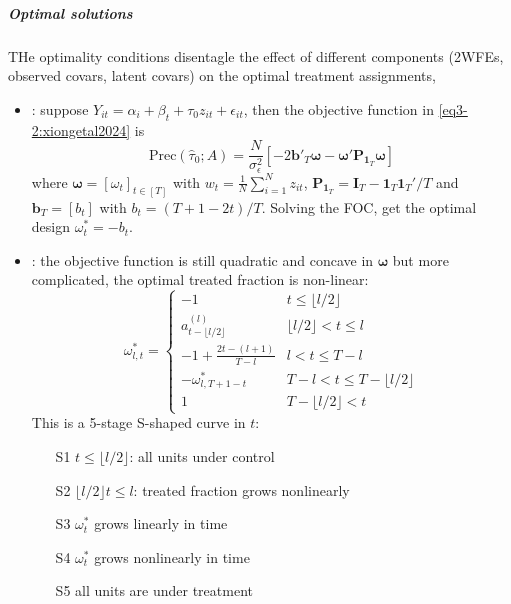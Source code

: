 \documentclass[twoside]{article}
\begin{document}
\subparagraph*{Optimal solutions}
THe optimality conditions disentagle the effect of different components (2WFEs, observed covars, latent covars) on the optimal treatment assignments, 
\begin{itemize}
    \item {}: suppose $Y_{it}=\alpha_i + \beta_t + \tau_0z_{it} + \epsilon_{it}$, then the objective function in \ref{eq3-2:xiongetal2024} is $$ \mathrm{Prec}\left(\hat{\tau}_0;A\right) = \frac{N}{\sigma^2_{\epsilon}} \left[ -2\mathbf{b}'_T \boldsymbol{\omega} - \boldsymbol{\omega}'\mathbf{P}_{\mathbf{1}_T}  \boldsymbol{\omega} \right] $$
    where $\boldsymbol{\omega}=\left[\omega_t\right]_{t\in[T]}$ with $w_t=\frac{1}{N}\sum^N_{i=1}z_{it}$, $\mathbf{P}_{\mathbf{1}_T}=\mathbf{I}_T-\mathbf{1}_T\mathbf{1}_T'/T$ and $\mathbf{b}_T=\left[b_t\right]$ with $b_t=(T+1-2t)/T$. Solving the FOC, get the optimal design $\omega^*_t = -b_t$.
    \item {}: the objective function is still quadratic and concave in $\boldsymbol{\omega}$ but more complicated, the optimal treated fraction is non-linear: 
    \begin{equation}\label{eq3-4:xiong2024optimal}
        \omega^*_{l,t} = \begin{cases}
            -1 & t\leq \lfloor l/2 \rfloor\\
            a^{(l)}_{t- \lfloor l/2 \rfloor} & \lfloor l/2 \rfloor<t\leq l \\
            -1+\frac{2t-(l+1)}{T-l} & l<t\leq T-l\\
            -\omega^*_{l,T+1-t} & T-l<t\leq T-\lfloor l/2 \rfloor\\
            1 & T-\lfloor l/2 \rfloor<t
        \end{cases}
    \end{equation}
    This is a 5-stage S-shaped curve in $t$:
    \begin{itemize}
        \item[S1] $t\leq \lfloor l/2 \rfloor$: all units under control
        \item[S2] $\lfloor l/2 \rfloor t\leq l$: treated fraction grows nonlinearly
        \item[S3] $\omega^*_t$ grows linearly in time 
        \item[S4] $\omega^*_t$ grows nonlinearly in time 
        \item[S5] all units are under treatment  
    \end{itemize}
\end{itemize}
\end{document}
